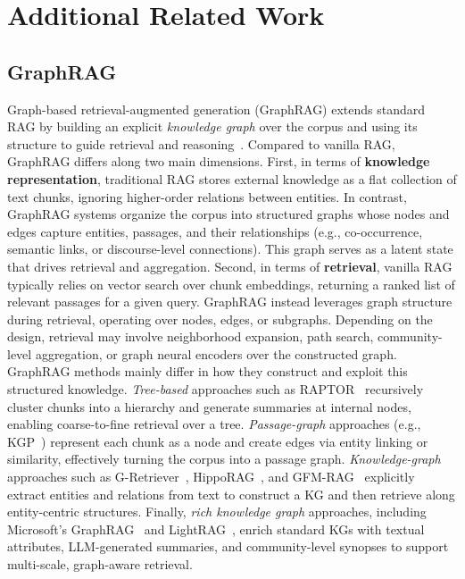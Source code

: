 
\section{Additional Related Work}
\subsection{GraphRAG}
\label{graphrag-appendix}
Graph-based retrieval-augmented generation (GraphRAG) extends standard RAG by building an explicit \emph{knowledge graph} over the corpus and using its structure to guide retrieval and reasoning~\cite{zhang2025survey}. Compared to vanilla RAG, GraphRAG differs along two main dimensions.
First, in terms of \textbf{knowledge representation}, traditional RAG stores external knowledge as a flat collection of text chunks, ignoring higher-order relations between entities. In contrast, GraphRAG systems organize the corpus into structured graphs whose nodes and edges capture entities, passages, and their relationships (e.g., co-occurrence, semantic links, or discourse-level connections). This graph serves as a latent state that drives retrieval and aggregation.
Second, in terms of \textbf{retrieval}, vanilla RAG typically relies on vector search over chunk embeddings, returning a ranked list of relevant passages for a given query. GraphRAG instead leverages graph structure during retrieval, operating over nodes, edges, or subgraphs. Depending on the design, retrieval may involve neighborhood expansion, path search, community-level aggregation, or graph neural encoders over the constructed graph.
GraphRAG methods mainly differ in how they construct and exploit this structured knowledge. 
\emph{Tree-based} approaches such as RAPTOR~\cite{sarthi2024raptor} recursively cluster chunks into a hierarchy and generate summaries at internal nodes, enabling coarse-to-fine retrieval over a tree. 
\emph{Passage-graph} approaches (e.g., KGP~\cite{wang2024knowledge}) represent each chunk as a node and create edges via entity linking or similarity, effectively turning the corpus into a passage graph. 
\emph{Knowledge-graph} approaches such as G-Retriever~\cite{he2024g}, HippoRAG~\cite{jimenez2024hipporag}, and GFM-RAG~\cite{luo2025gfm} explicitly extract entities and relations from text to construct a KG and then retrieve along entity-centric structures. 
Finally, \emph{rich knowledge graph} approaches, including Microsoft's GraphRAG~\cite{edge2024local} and LightRAG~\cite{guo2024lightrag}, enrich standard KGs with textual attributes, LLM-generated summaries, and community-level synopses to support multi-scale, graph-aware retrieval.

